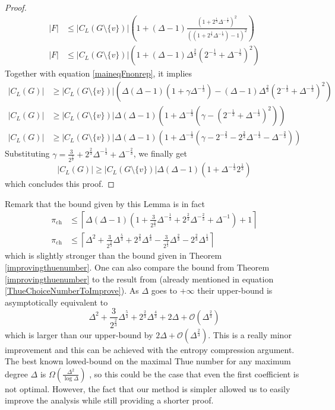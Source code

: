 \documentclass[a4paper,10pt]{article}
\begin{document}
\begin{proof}
\begin{align*}
 |F|&\le|C_L(G\setminus \{v\})|\left(1+(\Delta-1)\frac{(1+2^{\frac{1}{3}}\Delta^{-\frac{1}{3}})^2}{((1+2^{\frac{1}{3}}\Delta^{-\frac{1}{3}})-1)^2}\right)\\
 |F|&\le|C_L(G\setminus \{v\})|\left(1+(\Delta-1)\Delta^{\frac{2}{3}}\left(2^{-\frac{1}{3}}+\Delta^{-\frac{1}{3}}\right)^2\right)
\end{align*}
Together with equation \eqref{maineqFnonrep}, it implies
\begin{align*}
|C_L(G)|&\ge|C_L(G\setminus\{v\})|\left( \Delta(\Delta-1)(1+\gamma\Delta^{-\frac{1}{3}})-(\Delta-1)\Delta^{\frac{2}{3}}\left(2^{-\frac{1}{3}}+\Delta^{-\frac{1}{3}}\right)^2\right)\\
|C_L(G)|&\ge |C_L(G\setminus\{v\})|\Delta(\Delta-1)\left(1+ \Delta^{-\frac{1}{3}}\left(\gamma-\left(2^{-\frac{1}{3}}+\Delta^{-\frac{1}{3}}\right)^2\right)\right)\\
|C_L(G)|&\ge |C_L(G\setminus\{v\})|\Delta(\Delta-1)\left(1+ \Delta^{-\frac{1}{3}}\left(\gamma-2^{-\frac{2}{3}}-2^{\frac{2}{3}}\Delta^{-\frac{1}{3}}-\Delta^{-\frac{2}{3}}\right)\right)
\end{align*}
Substituting $\gamma=\frac{3}{2^{\frac{2}{3}}}+2^{\frac{2}{3}}\Delta^{-\frac{1}{3}}+\Delta^{-\frac{2}{3}}$, we finally get
$$|C_L(G)|\ge |C_L(G\setminus\{v\})|\Delta(\Delta-1)\left(1+ \Delta^{-\frac{1}{3}}2^{\frac{1}{3}}\right)$$
which concludes this proof.
\end{proof}

Remark that the bound given by this Lemma is in fact
\begin{align*}
 \pi_{\operatorname{ch}}&\le\left\lceil\Delta(\Delta-1)\left(1+ \frac{3}{2^{\frac{2}{3}}}\Delta^{-\frac{1}{3}}+2^{\frac{2}{3}}\Delta^{-\frac{2}{3}}+\Delta^{-1}\right)+1\right\rceil\\
 \pi_{\operatorname{ch}}&\le\left\lceil\Delta^2+\frac{3}{2^{\frac{2}{3}}}\Delta^{\frac{5}{3}}+2^{\frac{2}{3}}\Delta^{\frac{4}{3}}-\frac{3}{2^{\frac{2}{3}}}\Delta^{\frac{2}{3}}-2^{\frac{2}{3}}\Delta^{\frac{1}{3}}\right\rceil
\end{align*}
 which is slightly stronger than the bound given in Theorem \ref{improvingthuenumber}.
One can also compare the bound from  Theorem \ref{improvingthuenumber} to the result from \cite{MontassierEntropie} (already mentioned in equation \eqref{ThueChoiceNumberToImprove}).
As $\Delta$ goes to $+\infty$ their upper-bound is asymptotically equivalent to
 $$\Delta^2+\frac{3}{2^\frac{2}{3}}\Delta^\frac{5}{3}+
 2^\frac{2}{3}\Delta^{\frac{4}{3}}+2\Delta + \mathcal{O}(\Delta^{\frac{2}{3}})
 $$ which is larger than our upper-bound by $2\Delta + \mathcal{O}(\Delta^{\frac{2}{3}})$. 
 This is a really minor improvement and this can be achieved with the entropy compression argument.
 The best known lowed-bound on the maximal Thue number for any maximum degree $\Delta$ is $\Omega\left(\frac{\Delta^2}{\log \Delta}\right)$ \cite{alongraph}, so this could be the case that even the first coefficient is not optimal.
 However, the fact that our method is simpler allowed us to easily improve the analysis while still providing a shorter proof.
 
\end{document}
